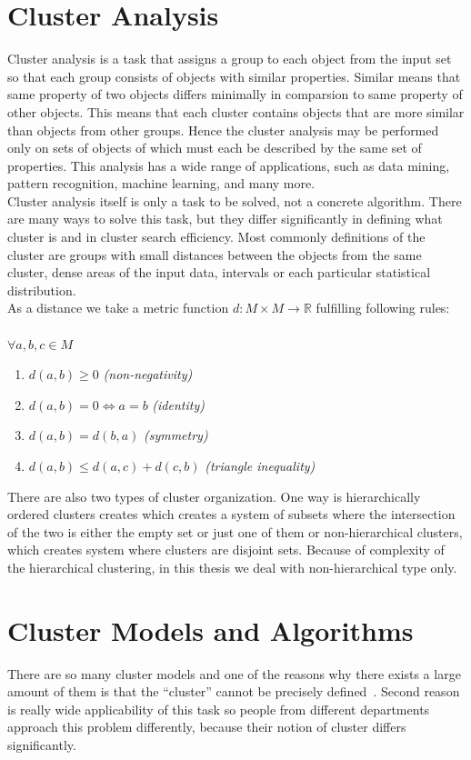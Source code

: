 \section{Cluster Analysis} \label{sec:clusteranalysis}
Cluster analysis is a task that assigns a group to each object from the input set so that each group consists of objects with similar properties. Similar means that same property of two objects differs minimally in comparsion to same property of other objects. This means that each cluster contains objects that are more similar than objects from other groups. Hence the cluster analysis may be performed only on sets of objects of which must each be described by the same set of properties. This analysis has a wide range of applications, such as data mining, pattern recognition, machine learning, and many more.\\
Cluster analysis itself is only a task to be solved, not a concrete algorithm. There are many ways to solve this task, but they differ significantly in defining what cluster is and in cluster search efficiency. Most commonly definitions of the cluster are groups with small distances between the objects from the same cluster, dense areas of the input data, intervals or each particular statistical distribution.\\
As a distance we take a metric function $d:M\times M \to \mathbb{R}$ fulfilling following rules:\\ \\
$ \forall  a,b,c \in M$
\begin{enumerate}
\item $d(a,b)\geq 0$ \textit{(non-negativity)}
\item $d(a,b) = 0 \iff a = b$ \textit{(identity)}
\item $d(a,b) = d(b,a)$ \textit{(symmetry)}
\item$d(a,b) \leq d(a,c) + d(c,b)$ \textit{(triangle inequality)}
\end{enumerate}
There are also two types of cluster organization. One way is hierarchically ordered clusters creates which creates a system of subsets where the intersection of the two is either the empty set or just one of them or non-hierarchical clusters, which creates system where clusters are disjoint sets. Because of complexity of the hierarchical clustering, in this thesis we deal with non-hierarchical type only.

\section{Cluster Models and Algorithms} \label{sec:clustermodels}
There are so many cluster models and one of the reasons why there exists a large amount of them is that the ``cluster'' cannot be precisely defined~\cite{EstivillCastro02}. Second reason is really wide applicability of this task so people from different departments approach this problem differently, because their notion of cluster differs significantly. \\

